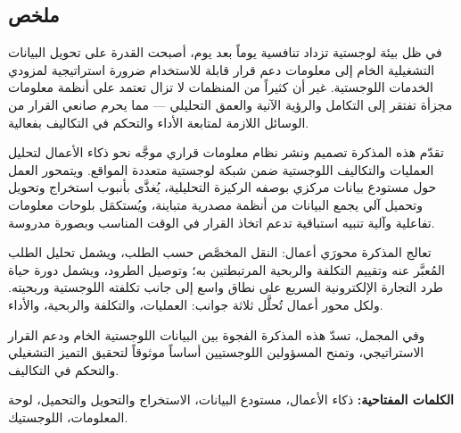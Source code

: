 {}

\begin{Arabic}

\chapter*{ملخص}

في ظل بيئة لوجستية تزداد تنافسية يوماً بعد يوم، أصبحت القدرة على تحويل البيانات
التشغيلية الخام إلى معلومات دعم قرار قابلة للاستخدام ضرورة استراتيجية لمزودي الخدمات
اللوجستية. غير أن كثيراً من المنظمات لا تزال تعتمد على أنظمة معلومات مجزأة تفتقر
إلى التكامل والرؤية الآنية والعمق التحليلي --- مما يحرم صانعي القرار من الوسائل اللازمة
لمتابعة الأداء والتحكم في التكاليف بفعالية.

تقدّم هذه المذكرة تصميم ونشر نظام معلومات قراري موجَّه نحو ذكاء الأعمال لتحليل
العمليات والتكاليف اللوجستية ضمن شبكة لوجستية متعددة المواقع. ويتمحور العمل حول
مستودع بيانات مركزي بوصفه الركيزة التحليلية، يُغذَّى بأنبوب استخراج وتحويل وتحميل
آلي يجمع البيانات من أنظمة مصدرية متباينة، ويُستكمَل بلوحات معلومات تفاعلية وآلية
تنبيه استباقية تدعم اتخاذ القرار في الوقت المناسب وبصورة مدروسة.

تعالج المذكرة محورَي أعمال: النقل المخصَّص حسب الطلب، ويشمل تحليل الطلب المُعبَّر
عنه وتقييم التكلفة والربحية المرتبطتين به؛ وتوصيل الطرود، ويشمل دورة حياة طرد
التجارة الإلكترونية السريع على نطاق واسع إلى جانب تكلفته اللوجستية وربحيته. ولكل
محور أعمال تُحلَّل ثلاثة جوانب: العمليات، والتكلفة والربحية، والأداء.

وفي المجمل، تسدّ هذه المذكرة الفجوة بين البيانات اللوجستية الخام ودعم القرار
الاستراتيجي، وتمنح المسؤولين اللوجستيين أساساً موثوقاً لتحقيق التميز التشغيلي
والتحكم في التكاليف.

\bigskip
\vspace{0.5cm}

\noindent\textbf{الكلمات المفتاحية:}
ذكاء الأعمال، مستودع البيانات، الاستخراج والتحويل والتحميل، لوحة المعلومات، اللوجستيك.

\end{Arabic}
